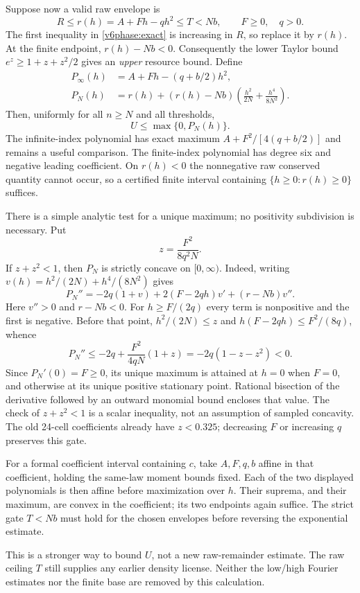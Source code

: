 Suppose now a valid raw envelope is
\[
 R\le r(h)=A+Fh-qh^2\le T<Nb,\qquad F\ge0,\quad q>0.
\]
The first inequality in \eqref{v6phase:exact} is increasing in $R$, so
replace it by $r(h)$. At the finite endpoint, $r(h)-Nb<0$.
Consequently the lower Taylor bound $e^z\ge1+z+z^2/2$ gives an
\emph{upper} resource bound. Define
\begin{align*}
 P_\infty(h)&=A+Fh-(q+b/2)h^2,\\
 P_N(h)&=r(h)+(r(h)-Nb)
                    \left(\frac{h^2}{2N}+\frac{h^4}{8N^2}\right).
\end{align*}
Then, uniformly for all $n\ge N$ and all thresholds,
\begin{equation}\label{v6phase:polynomial}
 U\le\max\{0,P_N(h)\}.
\end{equation}
The infinite-index polynomial has exact maximum
$A+F^2/[4(q+b/2)]$ and remains a useful comparison.
The finite-index polynomial has degree six and negative leading coefficient.
On $r(h)<0$ the
nonnegative raw conserved quantity cannot occur, so a certified finite
interval containing $\{h\ge0:r(h)\ge0\}$ suffices.

There is a simple analytic test for a unique maximum; no positivity
subdivision is necessary. Put
\[
 z=\frac{F^2}{8q^2N}.
\]
If $z+z^2<1$, then $P_N$ is strictly concave on $[0,\infty)$.
Indeed, writing $v(h)=h^2/(2N)+h^4/(8N^2)$ gives
\[
 P_N''=-2q(1+v)+2(F-2qh)v'+(r-Nb)v''.
\]
Here $v''>0$ and $r-Nb<0$. For $h\ge F/(2q)$ every term is
nonpositive and the first is negative. Before that point,
$h^2/(2N)\le z$ and
$h(F-2qh)\le F^2/(8q)$, whence
\[
 P_N''\le-2q+\frac{F^2}{4qN}(1+z)
          =-2q(1-z-z^2)<0.
\]
Since $P_N'(0)=F\ge0$, its unique maximum is attained at $h=0$ when
$F=0$, and otherwise at its unique positive stationary point. Rational bisection of the
derivative followed by an outward monomial bound encloses that value.
The check of $z+z^2<1$ is a scalar inequality, not an assumption of
sampled concavity. The old 24-cell coefficients already have $z<0.325$;
decreasing $F$ or increasing $q$ preserves this gate.

For a formal coefficient interval containing $c$, take $A,F,q,b$ affine
in that coefficient, holding the same-law moment bounds fixed. Each of
the two displayed polynomials is then affine before maximization over
$h$. Their suprema, and their maximum, are convex in the coefficient;
its two endpoints again suffice. The strict gate $T<Nb$ must hold for
the chosen envelopes before reversing the exponential estimate.

This is a stronger way to bound $U$, not a new raw-remainder estimate.
The raw ceiling $T$ still supplies any earlier density license. Neither
the low/high Fourier estimates nor the finite base are removed by this
calculation.
